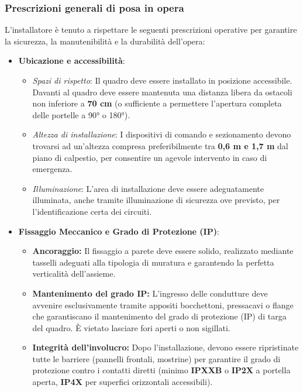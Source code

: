 \subsubsection{Prescrizioni generali di posa in opera}
L'installatore è tenuto a rispettare le seguenti prescrizioni operative per garantire la sicurezza, la manutenibilità e la durabilità dell'opera:

\begin{itemize}
    \item \textbf{Ubicazione e accessibilità}:
    \begin{itemize}
        \item \textit{Spazi di rispetto}: Il quadro deve essere installato in posizione accessibile. Davanti al quadro deve essere mantenuta una distanza libera da ostacoli non inferiore a \textbf{70 cm} (o sufficiente a permettere l'apertura completa delle portelle a 90° o 180°).
        \item \textit{Altezza di installazione}: I dispositivi di comando e sezionamento devono trovarsi ad un'altezza compresa preferibilmente tra \textbf{0,6 m e 1,7 m} dal piano di calpestio, per consentire un agevole intervento in caso di emergenza.
        \item \textit{Illuminazione}: L'area di installazione deve essere adeguatamente illuminata, anche tramite illuminazione di sicurezza ove previsto, per l'identificazione certa dei circuiti.

    \end{itemize}
    \item \textbf{Fissaggio Meccanico e Grado di Protezione (IP)}:
    \begin{itemize}
    \item \textbf{Ancoraggio:} Il fissaggio a parete deve essere solido, realizzato mediante tasselli adeguati alla tipologia di muratura e garantendo la perfetta verticalità dell'assieme.
    
    \item \textbf{Mantenimento del grado IP:} L'ingresso delle condutture deve avvenire esclusivamente tramite appositi bocchettoni, pressacavi o flange che garantiscano il mantenimento del grado di protezione (IP) di targa del quadro. È vietato lasciare fori aperti o non sigillati.
    
    \item \textbf{Integrità dell'involucro:} Dopo l'installazione, devono essere ripristinate tutte le barriere (pannelli frontali, mostrine) per garantire il grado di protezione contro i contatti diretti (minimo \textbf{IPXXB} o \textbf{IP2X} a portella aperta, \textbf{IP4X} per superfici orizzontali accessibili).
    \end{itemize}
\end{itemize}


